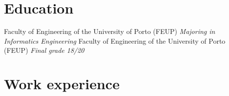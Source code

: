 \documentclass[letterpaper]{twentysecondcv} %
\begin{document}
\section{Education}

\begin{twenty}
    {Faculty of Engineering of the University of Porto (FEUP)}
    {\emph{Majoring in Informatics Engineering}}
    {Faculty of Engineering of the University of Porto (FEUP)}
    {\emph{Final grade 18/20}}
\end{twenty}


%


%


\section{Work experience}
\end{document}
